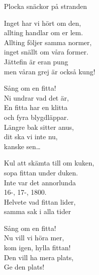 \begin{song}{Plocka snäckor på stranden}
	
	
	
	Inget har vi hört om den,\\
	allting handlar om er lem.\\
	Allting följer samma normer,\\
	inget snällt om våra former.\\
	Jättefin är eran pung\\
	men våran grej är också kung!
	
	Sång om en fitta!\\
	Ni undrar vad det är,\\
	En fitta har en klitta\\
	och fyra blygdläppar.\\
	Längre bak sitter anus,\\
	dit ska vi inte nu,\\
	kanske sen\ldots
	
	Kul att skämta till om kuken,\\
	sopa fittan under duken.\\
	Inte var det annorlunda\\
	16-, 17-, 1800.\\
	Helvete vad fittan lider,\\
	samma sak i alla tider
	
	Sång om en fitta!\\
	Nu vill vi höra mer,\\
	kom igen, hylla fittan!\\
	Den vill ha mera plats,\\
	Ge den plats!
	
\end{song}
